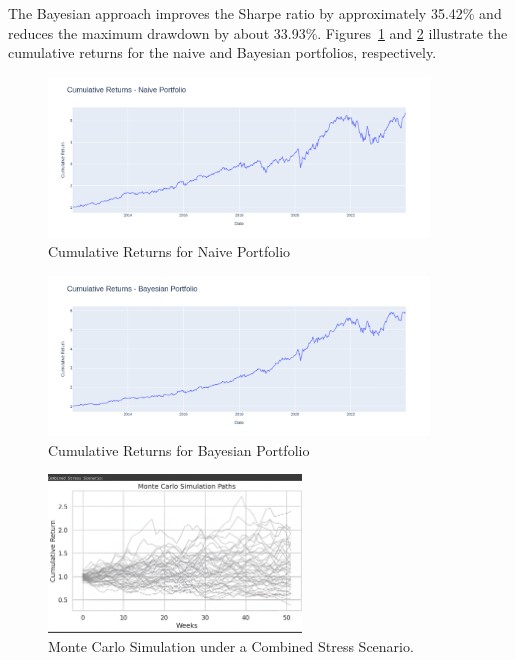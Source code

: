 \documentclass[a4paper,12pt]{article}
\begin{document}
The Bayesian approach improves the Sharpe ratio by approximately 35.42\% and reduces the maximum drawdown by about 33.93\%. Figures~\ref{fig:cum_returns_naive} and \ref{fig:cum_returns_bayes} illustrate the cumulative returns for the naive and Bayesian portfolios, respectively.

\begin{figure}[H]
    \centering
    \includegraphics[width=0.9\textwidth]{figures/Figure1.png}
    \caption{Cumulative Returns for Naive Portfolio}
    \label{fig:cum_returns_naive}
\end{figure}

\begin{figure}[H]
    \centering
    \includegraphics[width=0.9\textwidth]{figures/Figure2.png}
    \caption{Cumulative Returns for Bayesian Portfolio}
    \label{fig:cum_returns_bayes}
\end{figure}

\begin{figure}[H]
\centering
\includegraphics[width=0.6\textwidth]{figures/Figure3.png} 
\caption{Monte Carlo Simulation under a Combined Stress Scenario.}
\label{fig:stress}
\end{figure}
\end{document}
